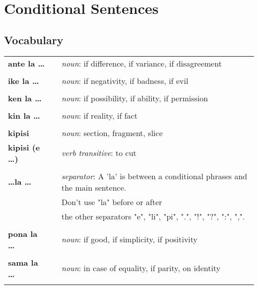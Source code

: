 \section{Conditional Sentences}
%
\subsection*{Vocabulary}
%
\begin{supertabular}{p{2,5cm}|ll}
%
\textbf{ante la \dots} && \textit{noun}: if difference, if variance, if disagreement  \\ %
 && \\ %
%
\textbf{ike la \dots} && \textit{noun}: if negativity, if badness, if evil \\ %
 && \\ %
%
\textbf{ken la \dots} && \textit{noun}: if possibility, if ability, if permission \\ %
 && \\ %
%
\textbf{kin la \dots} && \textit{noun}: if reality, if fact \\  %
 && \\ %
%
\textbf{kipisi} && \textit{noun}: section, fragment, slice \\ %
\textbf{kipisi (e \dots)} && \textit{verb transitive}: to cut \\ %
 && \\ %
%
\textbf{\dots la \dots} && \textit{separator}: A 'la' is between a conditional phrases and the main sentence. \\ &&  Don't use "la" before or after \\ && the other separators "e", "li", "pi", ".", "!", "?", ":", ",".  \\ %
 && \\ %
%
\textbf{pona la \dots} && \textit{noun}: if good, if simplicity, if positivity \\ %
 && \\ %
%
\textbf{sama la \dots} && \textit{noun}: in case of equality, if parity, on identity  \\  
 && \\ %
%
\end{supertabular} \\
%
\newpage
%
